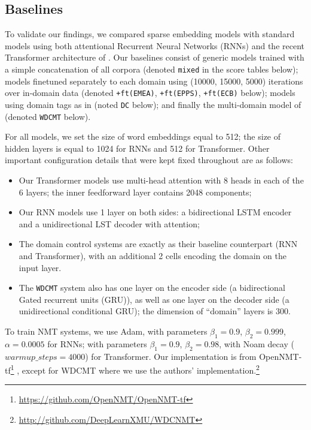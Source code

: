 \documentclass[11pt,a4paper]{article}
\newcommand{\fyTodo}[1]{\Todo[FY:]{\textcolor{orange}{#1}}}
\newcommand{\fyDone}[1]{\done[FY]\Todo[FY:]{\textcolor{orange}{#1}}}
\begin{document}
\subsection{Baselines \label{ssec:baselines}}
To validate our findings, we compared sparse embedding models with standard models using both attentional Recurrent Neural Networks (RNNs) \cite{Bahdanau15learning} and the recent Transformer architecture of \citet{Vaswani17attention}. Our baselines consist of generic models trained with a simple concatenation of all corpora (denoted \texttt{mixed} in the score tables below); models finetuned separately to each domain using (10000, 15000, 5000) iterations over in-domain data (denoted \texttt{+ft(EMEA)}, \texttt{+ft(EPPS)}, \texttt{+ft(ECB)} below); models using domain tags as in \cite{Kobus17domaincontrol} (noted \texttt{DC} below); and finally the multi-domain model of \citet{Zeng18multidomain} (denoted \texttt{WDCMT} below).\fyTodo{Change names in tables}

For all models, we set the size of word embeddings equal to 512; the size of hidden layers is equal to 1024 for RNNs and 512 for Transformer. Other important configuration details that were kept fixed throughout are as follows:
\fyDone{Improve this}
\begin{itemize}
\item Our Transformer models use multi-head attention with 8 heads in each of the 6 layers; the inner feedforward layer contains 2048 components; 
\item Our RNN models use 1 layer on both sides: a bidirectional LSTM encoder and a unidirectional LST decoder with attention;
\item The domain control systems are exactly as their baseline counterpart (RNN and Transformer), with an additional 2 cells encoding the domain on the input layer.\fyTodo{Check This!}
\item The \texttt{WDCMT} system also has one layer on the encoder side (a bidirectional Gated recurrent units (GRU)), as well as one layer on the decoder side (a unidirectional conditional GRU); the dimension of ``domain'' layers is 300.
\end{itemize}
To train NMT systems, we use Adam, with parameters $\beta_1=0.9$, $\beta_2 = 0.999$, $\alpha=0.0005$ for RNNs; with parameters $\beta_1=0.9$, $\beta_2= 0.98$, with Noam decay \cite{Vaswani17attention} ($warmup\_steps=4000$) for Transformer. Our implementation is from OpenNMT-tf\footnote{\url{https://github.com/OpenNMT/OpenNMT-tf}} \cite{Klein2017OpenNMT}, except for WDCMT where we use the authors' implementation.\footnote{\noindent\url{http://github.com/DeepLearnXMU/WDCNMT}}\fyTodo{batch size}
\end{document}
